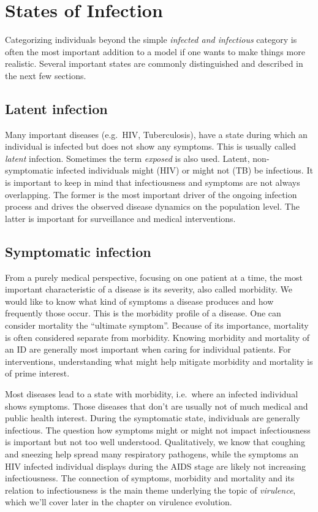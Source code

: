 \documentclass[
]{book}
\begin{document}
\hypertarget{states-of-infection}{%
\section{States of Infection}\label{states-of-infection}}

Categorizing individuals beyond the simple \emph{infected and infectious} category is often the most important addition to a model if one wants to make things more realistic. Several important states are commonly distinguished and described in the next few sections.

\hypertarget{latent-infection}{%
\subsection{Latent infection}\label{latent-infection}}

Many important diseases (e.g.~HIV, Tuberculosis), have a state during which an individual is infected but does not show any symptoms. This is usually called \emph{latent} infection. Sometimes the term \emph{exposed} is also used. Latent, non-symptomatic infected individuals might (HIV) or might not (TB) be infectious. It is important to keep in mind that infectiousness and symptoms are not always overlapping. The former is the most important driver of the ongoing infection process and drives the observed disease dynamics on the population level. The latter is important for surveillance and medical interventions.

\hypertarget{symptomatic-infection}{%
\subsection{Symptomatic infection}\label{symptomatic-infection}}

From a purely medical perspective, focusing on one patient at a time, the most important characteristic of a disease is its severity, also called morbidity. We would like to know what kind of symptoms a disease produces and how frequently those occur. This is the morbidity profile of a disease. One can consider mortality the ``ultimate symptom''. Because of its importance, mortality is often considered separate from morbidity. Knowing morbidity and mortality of an ID are generally most important when caring for individual patients. For interventions, understanding what might help mitigate morbidity and mortality is of prime interest.

Most diseases lead to a state with morbidity, i.e.~where an infected individual shows symptoms. Those diseases that don't are usually not of much medical and public health interest. During the symptomatic state, individuals are generally infectious. The question how symptoms might or might not impact infectiousness is important but not too well understood. Qualitatively, we know that coughing and sneezing help spread many respiratory pathogens, while the symptoms an HIV infected individual displays during the AIDS stage are likely not increasing infectiousness. The connection of symptoms, morbidity and mortality and its relation to infectiousness is the main theme underlying the topic of \emph{virulence}, which we'll cover later in the chapter on virulence evolution.
\end{document}

